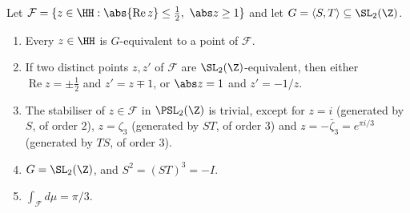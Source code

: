 \begin{theorem}\label{thm:modforms:fundamental-domain}
Let $\mathcal F=\{z\in\HH:\abs{\operatorname{Re}z}\le\frac12,\ \abs z\ge1\}$ and let $G=\langle S,T\rangle\subseteq\SL_2(\Z)$.
\begin{enumerate}[label=(\roman*)]
\item Every $z\in\HH$ is $G$-equivalent to a point of $\mathcal F$.
\item If two distinct points $z,z'$ of $\mathcal F$ are $\SL_2(\Z)$-equivalent, then either $\operatorname{Re}z=\pm\frac12$ and $z'=z\mp1$, or $\abs z=1$ and $z'=-1/z$.
\item The stabiliser of $z\in\mathcal F$ in $\PSL_2(\Z)$ is trivial, except for $z=i$ (generated by $S$, of order $2$), $z=\zeta_3$ (generated by $ST$, of order
$3$) and $z=-\bar\zeta_3=e^{\pi i/3}$ (generated by $TS$, of order $3$).
\item $G=\SL_2(\Z)$, and $S^2=(ST)^3=-I$.
\item $\int_{\mathcal F}d\mu=\pi/3$.
\end{enumerate}
\end{theorem}

